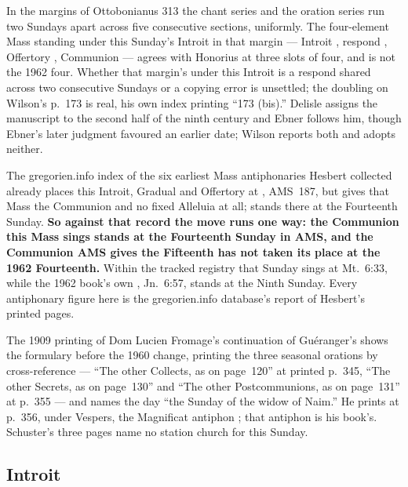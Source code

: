 In the margins of Ottobonianus 313 the chant series and the oration series run
two Sundays apart across five consecutive sections, uniformly. The four-element
Mass standing under this Sunday's Introit in that margin --- Introit
, respond , Offertory
, Communion  --- agrees with
Honorius at three slots of four, and is not the 1962 four. Whether that margin's
 under this Introit is a respond shared across two
consecutive Sundays or a copying error is unsettled; the doubling on Wilson's
p.~173 is real, his own index printing ``173 (bis).'' Delisle assigns the
manuscript to the second half of the ninth century and Ebner follows him, though
Ebner's later judgment favoured an earlier date; Wilson reports both and adopts
neither.

The gregorien.info index of the six earliest Mass antiphonaries Hesbert collected
already places this Introit, Gradual and Offertory at , AMS~187, but gives that Mass the Communion  and no fixed Alleluia at all;  stands
there at the Fourteenth Sunday. \textbf{So against that record the move runs one
way: the Communion this Mass sings stands at the Fourteenth Sunday in AMS, and
the Communion AMS gives the Fifteenth has not taken its place at the 1962
Fourteenth.} Within the tracked registry that Sunday sings  at Mt.\ 6:33, while the 1962 book's own , Jn.\ 6:57, stands at the Ninth Sunday. Every antiphonary figure here is
the gregorien.info database's report of Hesbert's printed pages.

The 1909 printing of Dom Lucien Fromage's continuation of Guéranger's  shows the formulary before the 1960 change, printing the
three seasonal orations by cross-reference --- ``The other Collects, as on
page~120'' at printed p.~345, ``The other Secrets, as on page~130'' and ``The
other Postcommunions, as on page~131'' at p.~355 --- and names the day ``the
Sunday of the widow of Naim.'' He prints at p.~356, under Vespers, the Magnificat
antiphon ; that antiphon is his book's. Schuster's three pages name no station church
for this Sunday.

\subsection*{Introit }

